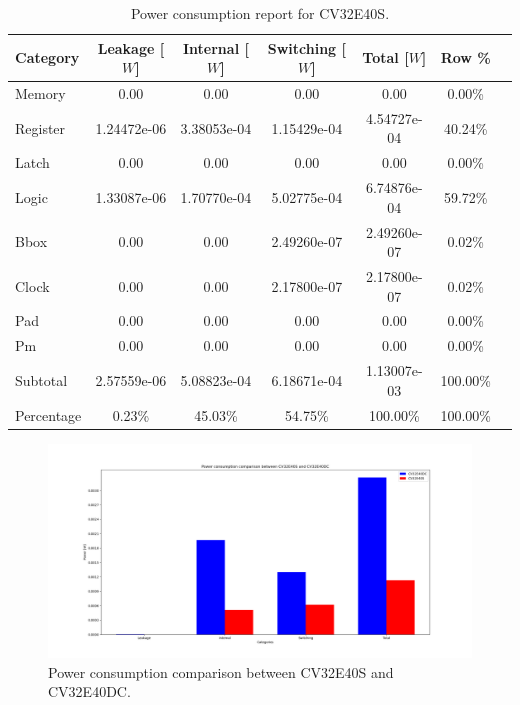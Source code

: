 \begin{table}[h]
\centering
\caption{Power consumption report for CV32E40S.}
\label{tab:cv32e40s_power}
\begin{tabular}{l|cccccc}
\toprule
Category & Leakage [$W$] & Internal [$W$] & Switching [$W$] & Total [$W$] & Row \% \\
\midrule
\rowcolor{black!20} Memory & 0.00 & 0.00 & 0.00 & 0.00 & 0.00\% \\
Register & 1.24472e-06 & 3.38053e-04 & 1.15429e-04 & 4.54727e-04 & 40.24\% \\
\rowcolor{black!20}Latch & 0.00 & 0.00 & 0.00 & 0.00 & 0.00\% \\
Logic & 1.33087e-06 & 1.70770e-04 & 5.02775e-04 & 6.74876e-04 & 59.72\% \\
\rowcolor{black!20}Bbox & 0.00 & 0.00 & 2.49260e-07 & 2.49260e-07 & 0.02\% \\
Clock & 0.00 & 0.00 & 2.17800e-07 & 2.17800e-07 & 0.02\% \\
\rowcolor{black!20}Pad & 0.00 & 0.00 & 0.00 & 0.00 & 0.00\% \\
Pm & 0.00 & 0.00 & 0.00 & 0.00 & 0.00\% \\
\midrule
\rowcolor{black!20} Subtotal & 2.57559e-06 & 5.08823e-04 & 6.18671e-04 & 1.13007e-03 & 100.00\% \\
Percentage & 0.23\% & 45.03\% & 54.75\% & 100.00\% & 100.00\% \\
\bottomrule
\end{tabular}
\end{table}

\begin{figure}[h!]
    \centering
    \includegraphics[width=\textwidth]{docs/images/power_comparison.png}
    \caption{Power consumption comparison between CV32E40S and CV32E40DC.}
    \label{fig:power_comapre}
\end{figure}

